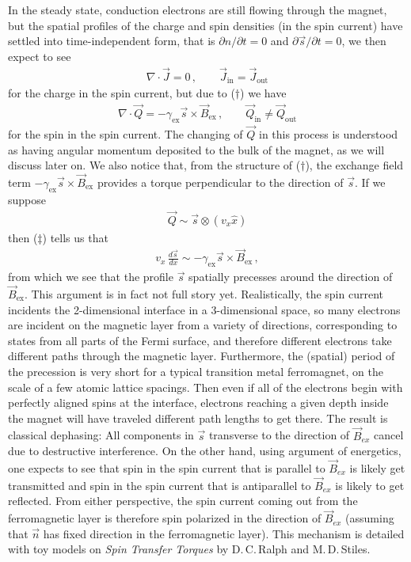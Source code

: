 \documentclass[11pt, onesided]{book}
\theoremstyle{break}
\theoremstyle{break}
\newcommand{\pd}{\partial}
\begin{document}
In the steady state, conduction electrons are still flowing through the magnet, but the spatial profiles of the charge and spin densities (in the spin current) have settled into time-independent form, that is $\pd n/\pd t = 0$ and $\pd\vec{s}/\pd t = 0$, we then expect to see
\begin{align*}
\nabla \cdot \vec{J} = 0\,,\qquad\vec{J}_{\text{in}} = \vec{J}_{\text{out}}
\end{align*}
for the charge in the spin current, but due to ($\dagger$) we have
\begin{align*}
\nabla \cdot \vec{Q} = -\gamma_{\text{ex}} \vec{s} \times \vec{B}_{\text{ex}}\,,\qquad
\vec{Q}_{\text{in}}\neq \vec{Q}_{\text{out}} \tag{$\ddagger$}
\end{align*}
for the spin in the spin current. The changing of $\vec{Q}$ in this process is understood as having angular momentum deposited to the bulk of the magnet, as we will discuss later on. We also notice that, from the structure of ($\dagger$), the exchange field term $-\gamma_{\text{ex}} \vec{s}\times \vec{B}_{\text{ex}}$ provides a torque perpendicular to the direction of $\vec{s}$. If we suppose
\begin{align*}
\vec{Q} \sim \vec{s}\otimes (v_x \hat{x})
\end{align*}
then ($\ddagger$) tells us that 
\begin{align*}
v_x \,\frac{d\vec{s}}{dx} \sim -\gamma_{\text{ex}} \vec{s}\times \vec{B}_{\text{ex}}\,,
\end{align*}
from which we see that the profile $\vec{s}$ spatially precesses around the direction of $\vec{B}_{\text{ex}}$. This argument is in fact not full story yet. Realistically, the spin current incidents the 2-dimensional interface in a 3-dimensional space, so many electrons are incident on the magnetic layer
from a variety of directions, corresponding to states from all
parts of the Fermi surface, and therefore different electrons
take different paths through the magnetic layer. Furthermore, the (spatial) period of the precession is very short for a typical transition metal ferromagnet, on the scale of a few atomic lattice
spacings. Then even if all of the electrons begin with perfectly aligned spins at the interface, electrons reaching a
given depth inside the magnet will have traveled different
path lengths to get there. The result is classical dephasing: All components in $\vec{s}$ transverse to the direction of $\vec{B}_{ex}$ cancel due to destructive interference. On the other hand, using argument of energetics, one expects to see that spin in the spin current that is parallel to $\vec{B}_{ex}$ is likely get transmitted and spin in the spin current that is antiparallel to $\vec{B}_{ex}$ is likely to get reflected. From either perspective, the spin current coming out from the ferromagnetic layer is therefore spin polarized in the direction of $\vec{B}_{ex}$ (assuming that $\vec{n}$ has fixed direction in the ferromagnetic layer). This mechanism is detailed with toy models on \textit{Spin Transfer Torques} by D.\,C.\,Ralph and M.\,D.\,Stiles. \\
\end{document}
